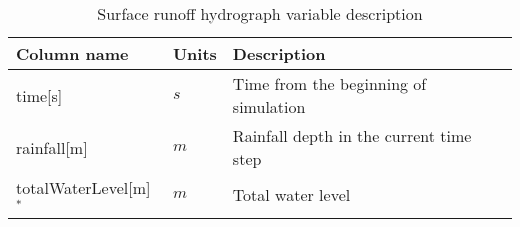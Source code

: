 \begin{table}[t]
 

 \centering
    \caption{Surface runoff hydrograph variable description}
\label{tab:hydrographs}
\begin{tabular}{llp{}}
  \hline  \hline
 Column name  & Units      & Description       \\
  \hline
 time[s]          &   $s$      &  Time from the beginning of simulation          \\
 rainfall[m]      &  $m$         &  Rainfall depth in the current time step \\
 totalWaterLevel[m]$^*$   &   $m$   &  Total water level  \\

\end{tabular}
\end{table}
